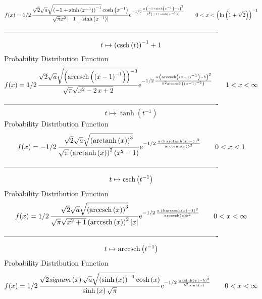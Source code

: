 \documentclass[12pt]{article}
\begin{document}
$$  f(x)=1/2\,{\frac {\sqrt {2}\sqrt {a}\sqrt { \left( -1+\sinh \left( {x}^{-1}
 \right)  \right) ^{-1}}\cosh \left( {x}^{-1} \right) }{\sqrt {\pi}{x}
^{2} \left| -1+\sinh \left( {x}^{-1} \right)  \right| }{{\rm e}^{-1/2
\,{\frac {a\, \left( -1+\sinh \left( {x}^{-1} \right) -b \right) ^{2}
}{{b}^{2} \left( -1+\sinh \left( {x}^{-1} \right)  \right) }}}}}
 \qquad0
 < x <  \left( \ln  \left( 1+\sqrt {2} \right)  \right) ^{-1}
$$-------------------------------------------------------------------------------------------  \\$$t\mapsto  \left( {\rm csch} \left(t\right) \right) ^{-1}+1
$$Probability Distribution Function 
$$  f(x)=1/2\,{\frac {\sqrt {2}\sqrt {a}\sqrt { \left( {\rm arccsch} \left(
 \left( x-1 \right) ^{-1}\right) \right) ^{-3}}}{\sqrt {\pi}\sqrt {{x}
^{2}-2\,x+2}}{{\rm e}^{-1/2\,{\frac {a\, \left( {\rm arccsch} \left(
 \left( x-1 \right) ^{-1}\right)-b \right) ^{2}}{{b}^{2}{\rm arccsch} 
\left( \left( x-1 \right) ^{-1}\right)}}}}}
 \qquad1
 < x < \infty 
$$-------------------------------------------------------------------------------------------  \\$$t\mapsto \tanh \left( {t}^{-1} \right) 
$$Probability Distribution Function 
$$  f(x)=-1/2\,{\frac {\sqrt {2}\sqrt {a}\sqrt { \left( {\rm arctanh} \left(x
\right) \right) ^{3}}}{\sqrt {\pi} \left( {\rm arctanh} \left(x\right)
 \right) ^{2} \left( {x}^{2}-1 \right) }{{\rm e}^{-1/2\,{\frac {a\,
 \left( b\,{\rm arctanh} \left(x\right)-1 \right) ^{2}}{{\rm arctanh} 
\left(x\right){b}^{2}}}}}}
 \qquad0
 < x < 1
$$-------------------------------------------------------------------------------------------  \\$$t\mapsto {\rm csch} \left({t}^{-1}\right)
$$Probability Distribution Function 
$$  f(x)=1/2\,{\frac {\sqrt {2}\sqrt {a}\sqrt { \left( {\rm arccsch} \left(x
\right) \right) ^{3}}}{\sqrt {\pi}\sqrt {{x}^{2}+1} \left( 
{\rm arccsch} \left(x\right) \right) ^{2} \left| x \right| }{{\rm e}^{
-1/2\,{\frac {a\, \left( b\,{\rm arccsch} \left(x\right)-1 \right) ^{2
}}{{\rm arccsch} \left(x\right){b}^{2}}}}}}
 \qquad0
 < x < \infty 
$$-------------------------------------------------------------------------------------------  \\$$t\mapsto {\rm arccsch} \left({t}^{-1}\right)
$$Probability Distribution Function 
$$  f(x)=1/2\,{\frac {\sqrt {2}{\it signum} \left( x \right) \sqrt {a}\sqrt {
 \left( \sinh \left( x \right)  \right) ^{-1}}\cosh \left( x \right) 
}{\sinh \left( x \right) \sqrt {\pi}}{{\rm e}^{-1/2\,{\frac {a\,
 \left( \sinh \left( x \right) -b \right) ^{2}}{{b}^{2}\sinh \left( x
 \right) }}}}}
 \qquad0
 < x < \infty 
$$
\end{document}
